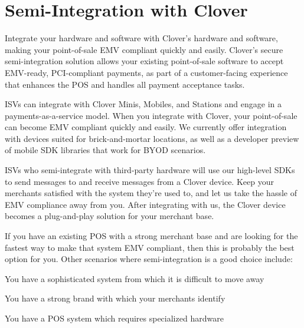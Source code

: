 \hypertarget{index_intro_sec}{}\section{Semi-\/\+Integration with Clover}\label{index_intro_sec}
Integrate your hardware and software with Clover’s hardware and software, making your point-\/of-\/sale E\+MV compliant quickly and easily. Clover’s secure semi-\/integration solution allows your existing point-\/of-\/sale software to accept E\+M\+V-\/ready, P\+C\+I-\/compliant payments, as part of a customer-\/facing experience that enhances the P\+OS and handles all payment acceptance tasks.

I\+S\+Vs can integrate with Clover Minis, Mobiles, and Stations and engage in a payments-\/as-\/a-\/service model. When you integrate with Clover, your point-\/of-\/sale can become E\+MV compliant quickly and easily. We currently offer integration with devices suited for brick-\/and-\/mortar locations, as well as a developer preview of mobile S\+DK libraries that work for B\+Y\+OD scenarios.

I\+S\+Vs who semi-\/integrate with third-\/party hardware will use our high-\/level S\+D\+Ks to send messages to and receive messages from a Clover device. Keep your merchants satisfied with the system they’re used to, and let us take the hassle of E\+MV compliance away from you. After integrating with us, the Clover device becomes a plug-\/and-\/play solution for your merchant base.

If you have an existing P\+OS with a strong merchant base and are looking for the fastest way to make that system E\+MV compliant, then this is probably the best option for you. Other scenarios where semi-\/integration is a good choice include\+:
\begin{DoxyItemize}
\item You have a sophisticated system from which it is difficult to move away
\item You have a strong brand with which your merchants identify
\item You have a P\+OS system which requires specialized hardware 
\end{DoxyItemize}